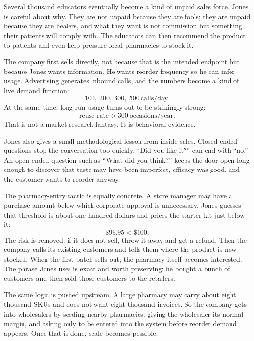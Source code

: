 Several thousand educators eventually become a kind of unpaid sales force. Jones is careful about why. They are not unpaid because they are fools; they are unpaid because they are healers, and what they want is not commission but something their patients will comply with. The educators can then recommend the product to patients and even help pressure local pharmacies to stock it.

The company first sells directly, not because that is the intended endpoint but because Jones wants information. He wants reorder frequency so he can infer usage. Advertising generates inbound calls, and the numbers become a kind of live demand function:
\begin{equation}
100,\ 200,\ 300,\ 500\ \text{calls/day}.
\end{equation}
At the same time, long-run usage turns out to be strikingly strong:
\begin{equation}
\text{reuse rate}>300\ \text{occasions/year}.
\end{equation}
That is not a market-research fantasy. It is behavioral evidence.

Jones also gives a small methodological lesson from inside sales. Closed-ended questions stop the conversation too quickly. ``Did you like it?'' can end with ``no.'' An open-ended question such as ``What did you think?'' keeps the door open long enough to discover that taste may have been imperfect, efficacy was good, and the customer wants to reorder anyway.

The pharmacy-entry tactic is equally concrete. A store manager may have a purchase amount below which corporate approval is unnecessary. Jones guesses that threshold is about one hundred dollars and prices the starter kit just below it:
\begin{equation}
\$99.95<\$100.
\end{equation}
The risk is removed: if it does not sell, throw it away and get a refund. Then the company calls its existing customers and tells them where the product is now stocked. When the first batch sells out, the pharmacy itself becomes interested. The phrase Jones uses is exact and worth preserving: he bought a bunch of customers and then sold those customers to the retailers.

The same logic is pushed upstream. A large pharmacy may carry about eight thousand SKUs and does not want eight thousand invoices. So the company gets into wholesalers by seeding nearby pharmacies, giving the wholesaler its normal margin, and asking only to be entered into the system before reorder demand appears. Once that is done, scale becomes possible.

